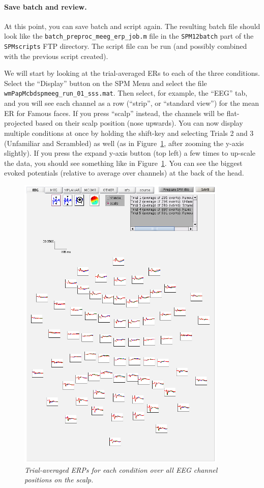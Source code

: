 \paragraph{Save batch and review.}

At this point, you can save batch and script again. The resulting batch file should look like the \texttt{batch\_preproc\_meeg\_erp\_job.m} file in the \texttt{SPM12batch} part of the \texttt{SPMscripts} FTP directory. The script file can be run (and possibly combined with the previous script created).

We will start by looking at the trial-averaged ERs to each of the three conditions. Select the ``Display'' button on the SPM Menu and select the file \texttt{wmPapMcbdspmeeg\_run\_01\_sss.mat}. Then select, for example, the ``EEG'' tab, and you will see each channel as a row (``strip'', or ``standard view'') for the mean ER for Famous faces. If you press ``scalp'' instead, the channels will be flat-projected based on their scalp position (nose upwards). You can now display multiple conditions at once by holding the shift-key and selecting Trials 2 and 3 (Unfamiliar and Scrambled) as well (as in Figure~\ref{multi:fig:2}, after zooming the y-axis slightly). If you press the expand y-axis button (top left) a few times to up-scale the data, you should see something like in Figure~\ref{multi:fig:2}. You can see the biggest evoked potentials (relative to average over channels) at the back of the head.

\begin{figure}
\begin{center}
\includegraphics[width=100mm]{multi/figures/figure2}
\caption{\em Trial-averaged ERPs for each condition over all EEG channel positions on the scalp. \label{multi:fig:2}}
\end{center}
\end{figure}

